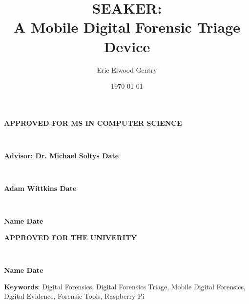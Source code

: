 \documentclass[12pt]{article}
\newcommand{\A}{\mathcal{A}}
\begin{document}
\begin{center}
{\large \bfseries APPROVED FOR MS IN COMPUTER SCIENCE \par}

\vspace{1.5 cm}

\hrulefill\\
{\large \bfseries Advisor: Dr. Michael Soltys \hfill Date \par}

\vspace{1.5 cm}

\hrulefill\\
{\large \bfseries Adam Wittkins \hfill Date \par}

\vspace{1.5 cm}

\hrulefill\\
{\large \bfseries Name \hfill Date \par}

\vspace{3 cm}

{\large \bfseries APPROVED FOR THE UNIVERITY \par}

\vspace{1.5 cm}

\hrulefill\\
{\large \bfseries Name \hfill Date \par}
\end{center}

\newpage



\newpage

\title{SEAKER:\protect\\A Mobile Digital Forensic Triage Device} 
\author{Eric Elwood Gentry}

\date{\today}
\maketitle

\small{\textbf{Keywords}: Digital Forensics, Digital Forensics Triage, Mobile Digital Forensics,
Digital Evidence, Forensic Tools, Raspberry Pi}
\\
\end{document}
